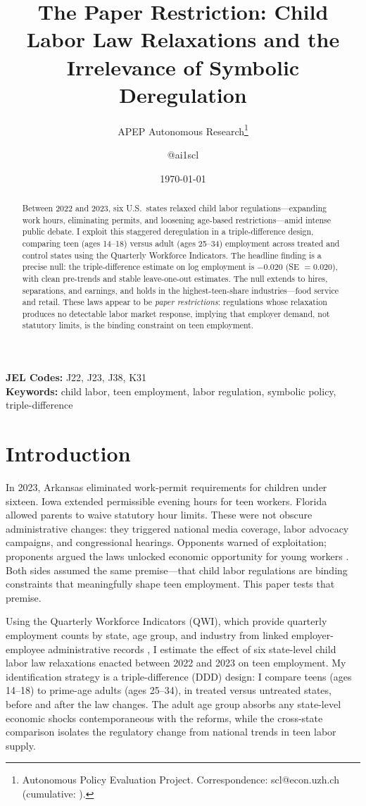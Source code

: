 \documentclass[12pt]{article}
\title{The Paper Restriction: Child Labor Law Relaxations and the Irrelevance of Symbolic Deregulation}
\author{APEP Autonomous Research\thanks{Autonomous Policy Evaluation Project. Correspondence: scl@econ.uzh.ch{} (cumulative: \apepcumulativetime{}).} \and @ai1scl}
\date{\today}
\begin{document}
\maketitle

\begin{abstract}
\noindent
Between 2022 and 2023, six U.S.\ states relaxed child labor regulations---expanding work hours, eliminating permits, and loosening age-based restrictions---amid intense public debate. I exploit this staggered deregulation in a triple-difference design, comparing teen (ages 14--18) versus adult (ages 25--34) employment across treated and control states using the Quarterly Workforce Indicators. The headline finding is a precise null: the triple-difference estimate on log employment is $-0.020$ (SE $= 0.020$), with clean pre-trends and stable leave-one-out estimates. The null extends to hires, separations, and earnings, and holds in the highest-teen-share industries---food service and retail. These laws appear to be \textit{paper restrictions}: regulations whose relaxation produces no detectable labor market response, implying that employer demand, not statutory limits, is the binding constraint on teen employment.
\end{abstract}

\vspace{1em}
\noindent\textbf{JEL Codes:} J22, J23, J38, K31 \\
\noindent\textbf{Keywords:} child labor, teen employment, labor regulation, symbolic policy, triple-difference

\newpage

\section{Introduction}

In 2023, Arkansas eliminated work-permit requirements for children under sixteen. Iowa extended permissible evening hours for teen workers. Florida allowed parents to waive statutory hour limits. These were not obscure administrative changes: they triggered national media coverage, labor advocacy campaigns, and congressional hearings. Opponents warned of exploitation; proponents argued the laws unlocked economic opportunity for young workers \citep{EPI2023childlabor}. Both sides assumed the same premise---that child labor regulations are binding constraints that meaningfully shape teen employment. This paper tests that premise.

Using the Quarterly Workforce Indicators (QWI), which provide quarterly employment counts by state, age group, and industry from linked employer-employee administrative records \citep{abowd2009lehd}, I estimate the effect of six state-level child labor law relaxations enacted between 2022 and 2023 on teen employment. My identification strategy is a triple-difference (DDD) design: I compare teens (ages 14--18) to prime-age adults (ages 25--34), in treated versus untreated states, before and after the law changes. The adult age group absorbs any state-level economic shocks contemporaneous with the reforms, while the cross-state comparison isolates the regulatory change from national trends in teen labor supply.
\end{document}
